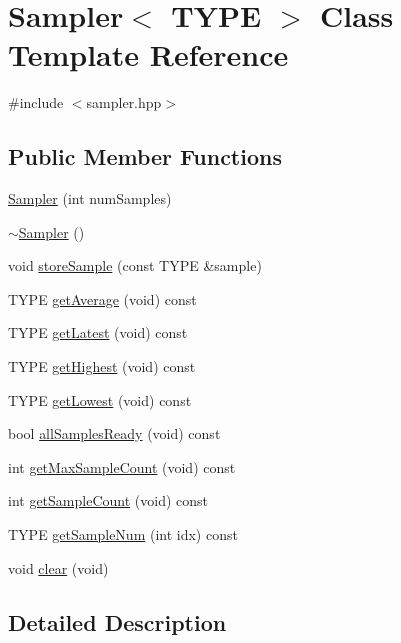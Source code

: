 \hypertarget{classSampler}{}\section{Sampler$<$ T\+Y\+PE $>$ Class Template Reference}
\label{classSampler}


{\ttfamily \#include $<$sampler.\+hpp$>$}

\subsection*{Public Member Functions}
\begin{DoxyCompactItemize}
\item 
\hyperlink{classSampler_a8c9bbbb87fdcdeac41af67ba9a0aa6ba}{Sampler} (int num\+Samples)
\item 
\hyperlink{classSampler_a5699fdfa7c7a4bdc010db49fee056da1}{$\sim$\+Sampler} ()
\item 
void \hyperlink{classSampler_acb346e1af623f20e9290b6f363bc5e06}{store\+Sample} (const T\+Y\+PE \&sample)
\item 
T\+Y\+PE \hyperlink{classSampler_a708f1872825888733086bc43cf0d075b}{get\+Average} (void) const 
\item 
T\+Y\+PE \hyperlink{classSampler_a86f8e01f057272420a51291bb49f2a9a}{get\+Latest} (void) const 
\item 
T\+Y\+PE \hyperlink{classSampler_a0b7bd0218a903180e4731f5d5dbf7d0e}{get\+Highest} (void) const 
\item 
T\+Y\+PE \hyperlink{classSampler_ae0af0329eab2cb11d6cd933b203af55f}{get\+Lowest} (void) const 
\item 
bool \hyperlink{classSampler_ae1f2f9bcba7dc5fde8c8fb3b04ef3583}{all\+Samples\+Ready} (void) const 
\item 
int \hyperlink{classSampler_acea7e239d4b7ef49ceea58da78824c3e}{get\+Max\+Sample\+Count} (void) const 
\item 
int \hyperlink{classSampler_a7e71c2c0fb7c55794d53c67c0dd98dc9}{get\+Sample\+Count} (void) const 
\item 
T\+Y\+PE \hyperlink{classSampler_a1c49b595a00bd682254ca647404f4b40}{get\+Sample\+Num} (int idx) const 
\item 
void \hyperlink{classSampler_a4b96c9da75670d8ff5140fbdf5a489bb}{clear} (void)
\end{DoxyCompactItemize}


\subsection{Detailed Description}
